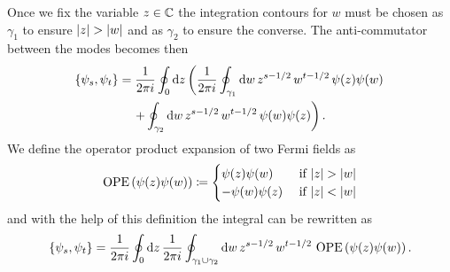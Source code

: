 \begin{figure}[htbp]
 \centering
 \def\first{0.5}
 \def\second{0.9}
 \end{figure}
 Once we fix the variable $z\in\mathbb{C}$ the integration
 contours for $w$ must be chosen as $\gamma_1$ 
 to ensure $\lvert z\rvert>\lvert w\rvert$ and as $\gamma_2$ 
 to ensure the converse. The anti-commutator between
 the modes becomes then
 \begin{multline*}
 \{\psi_s,\psi_t\}=\frac{1}{2\pi i}\oint_0 \textrm{d} z
 \left(\frac{1}{2\pi i}\oint_{\gamma_1} \textrm{d} w
 \,z^{s-1/2}\,w^{t-1/2}\,\psi(z)\psi(w)\right.\\
 \left.+\oint_{\gamma_2} \textrm{d} w
 \,z^{s-1/2}\,w^{t-1/2}\,\psi(w)\psi(z)\right).
 \end{multline*}
 We define the operator product expansion of two Fermi
 fields as
 \[
 \operatorname{OPE}\left(\psi(z)\psi(w)\right)\coloneqq
 \begin{cases}
 \psi(z)\psi(w)&\mbox{ if }\lvert z\rvert>\lvert w\rvert\\
 -\psi(w)\psi(z)&\mbox{ if }\lvert z\rvert<\lvert w\rvert
 \end{cases}
 \]
 and with the help of this definition the integral
 can be rewritten as
 \[
 \{\psi_s,\psi_t\}=\frac{1}{2\pi i}\oint_0 \textrm{d} z\,
 \frac{1}{2\pi i}\oint_{\gamma_1 \cup\gamma_2} \textrm{d} w\,
 z^{s-1/2}\,w^{t-1/2}\,\operatorname{OPE}\left(\psi(z)\psi(w)\right).
 \]
